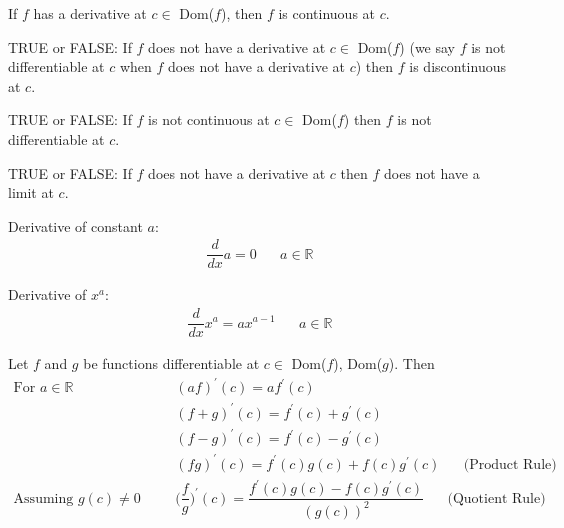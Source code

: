\begin{theorem}
If $f$ has a derivative at $c \in$ Dom($f$), then $f$ is continuous at $c$.
\end{theorem}

\begin{exercise}
TRUE or FALSE: If $f$ does not have a derivative at $c \in$ Dom($f$) (we say $f$ is not differentiable at $c$ when $f$ does not have a derivative at $c$) then $f$ is discontinuous at $c$.
\end{exercise}

\begin{exercise}
TRUE or FALSE: If $f$ is not continuous at $c \in$ Dom($f$)  then $f$ is not differentiable at $c$.
\end{exercise}

\begin{exercise}
TRUE or FALSE: If $f$ does not have a derivative at $c$ then $f$ does not have a limit at $c$.
\end{exercise}

\begin{theorem}
Derivative of constant $a$:
\begin{align*}
    \dfrac{d}{dx}a = 0 \hspace{20pt} a \in \mathbb{R}
\end{align*}
\end{theorem}

\begin{theorem}
Derivative of $x^{a}$:
\begin{align*}
    \dfrac{d}{dx}x^{a} = ax^{a-1} \hspace{20pt} a \in \mathbb{R}
\end{align*}
\end{theorem}

\begin{theorem}
Let $f$ and $g$ be functions differentiable at $c \in$ Dom($f$), Dom($g$). Then
\begin{align*}
    \text{For $a \in \mathbb{R}$} \hspace{20pt} &(af)^{'}(c) = af^{'}(c)\\[2ex]
    &(f+g)^{'}(c) = f^{'}(c) + g^{'}(c)\\[2ex]
    &(f-g)^{'}(c) = f^{'}(c) - g^{'}(c)\\[2ex]
    &(fg)^{'}(c) = f^{'}(c)g(c) + f(c)g^{'}(c) \hspace{20pt} \text{(Product Rule)}\\[2ex]
    \text{Assuming $g(c) \neq 0$} \hspace{20pt} &\Big(\dfrac{f}{g}\Big)^{'}(c) = \dfrac{f^{'}(c)g(c) - f(c)g^{'}(c)}{(g(c))^{2}} \hspace{20pt} \text{(Quotient Rule)}
\end{align*}
\end{theorem}

